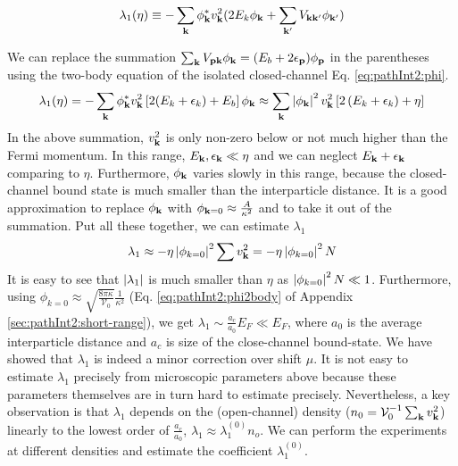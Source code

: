\begin{equation}
\lambda_{1}(\eta)\equiv-\sum_{\mathbf{k}}{\phi_{\mathbf{k}}^{*}}v_{\mathbf{k}}^{2}(2E_{k}\phi_{\mathbf{k}}+\sum_{\mathbf{k}'}V_{\mathbf{k}\mathbf{k}'}\phi_{\mathbf{k}'})
\end{equation}

We can replace the summation $\sum_{\mathbf{k}}V_{\mathbf{p}\mathbf{k}} \phi_{\mathbf{k}}=(E_{b}+2\epsilon_{\mathbf{p}})\phi_{\mathbf{p}}$ in the parentheses using the two-body \sch equation of the isolated closed-channel Eq. \ref{eq:pathInt2:phi}.
\begin{equation*}
\lambda_{1}(\eta)=-\sum_{\mathbf{k}}{\phi_{\mathbf{k}}^{*}}v_{\mathbf{k}}^{2}\left[2(E_{k}+\epsilon_{k})+E_b\right]\phi_{\mathbf{k}}
	\approx\sum_{\mathbf{k}}\left\lvert{\phi_{\ensuremath{\mathbf{k}}}}\right\rvert^2v_{\mathbf{k}}^{2}\left[2\left(E_{k}+\epsilon_{k}\right)+\eta\right]
\end{equation*}
In the above summation, $v_{\mathbf{k}}^2$ is only non-zero below or not much higher than the Fermi momentum.  In this range, $E_{\mathbf{k}},\epsilon_{\mathbf{k}}\ll\eta$ and we can neglect $E_{\mathbf{k}}+\epsilon_{\mathbf{k}}$ comparing to $\eta$.  
Furthermore, $\phi_{\mathbf{k}}$ varies slowly  in this range, because the closed-channel bound state is much smaller than the interparticle distance.    It is a good approximation to replace $\phi_{\mathbf{k}}$ with $\phi_{\mathbf{k}=0}\approx\frac{A}{\kappa^{2}}$ and to take it out of the summation.  
Put all these together, we can estimate $\lambda_{1}$ 
\begin{equation}\label{eq:pathInt2:lambda1es}
\lambda_{1}\approx-\eta\left\lvert{\phi_{k=0}}\right\rvert^2\sum{}v_{\mathbf{k}}^{2}=-\eta\left\lvert{\phi_{k=0}}\right\rvert^2N	
\end{equation}
It is easy to see that $\left\lvert{\lambda_{1}}\right\rvert$ is much smaller than $\eta$ as $\left\lvert{\phi_{k=0}}\right\rvert^2N\ll1$.  Furthermore, using $\phi_{k=0}\approx\sqrt{\frac{8\pi\kappa}{\mathcal{V}_{0}}}\frac{1}{\kappa^{2}}$ (Eq. \ref{eq:pathInt2:phi2body} of Appendix \ref{sec:pathInt2:short-range}), we get $\lambda_{1}\sim\frac{a_{c}}{a_{0}}E_{F}\ll{}E_{F}$, where $a_{0}$ is the average interparticle distance and $a_{c}$ is size of the close-channel bound-state.   We have showed that $\lambda_{1}$ is indeed a minor correction over shift $\mu$.
It is not easy to estimate $\lambda_{1}$ precisely from  microscopic parameters above because these parameters themselves are  in turn hard to  estimate precisely.  Nevertheless, a key observation is that $\lambda_1$ depends on the (open-channel) density ($n_{0}={\mathcal{V}_{0}^{-1}}\sum_{\mathbf{k}}v_{\mathbf{k}}^2$) linearly to the lowest order of $\frac{a_{c}}{a_{0}}$, $\lambda_1\approx\lambda_1^{(0)}n_{o}$.  We can perform the experiments at different densities and estimate the coefficient $\lambda_1^{(0)}$. 


